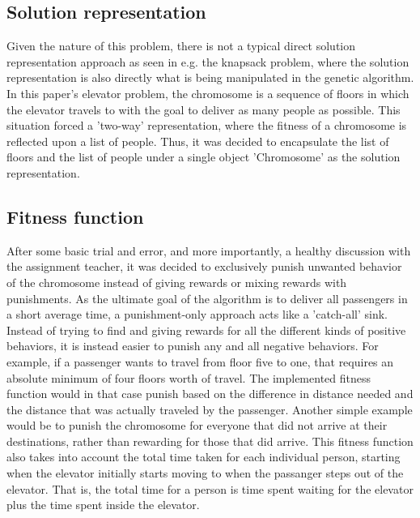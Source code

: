 \subsection{Solution representation}

Given the nature of this problem, there is not a typical direct solution representation approach as seen in e.g. the knapsack problem, where the solution representation is also directly what is being manipulated in the genetic algorithm. In this paper's elevator problem, the chromosome is a sequence of floors in which the elevator travels to with the goal to deliver as many people as possible. This situation forced a 'two-way' representation, where the fitness of a chromosome is reflected upon a list of people. Thus, it was decided to encapsulate the list of floors and the list of people under a single object 'Chromosome' as the solution representation.

\subsection{Fitness function}
\label{subsec:fitness_function}

After some basic trial and error, and more importantly, a healthy discussion with the assignment teacher, it was decided to exclusively punish unwanted behavior of the chromosome instead of giving rewards or mixing rewards with punishments. As the ultimate goal of the algorithm is to deliver all passengers in a short average time, a punishment-only approach acts like a 'catch-all' sink. Instead of trying to find and giving rewards for all the different kinds of positive behaviors, it is instead easier to punish any and all negative behaviors. For example, if a passenger wants to travel from floor five to one, that requires an absolute minimum of four floors worth of travel. The implemented fitness function would in that case punish based on the difference in distance needed and the distance that was actually traveled by the passenger. Another simple example would be to punish the chromosome for everyone that did not arrive at their destinations, rather than rewarding for those that did arrive.  This fitness function also takes into account the total time taken for each individual person, starting when the elevator initially starts moving to when the passanger steps out of the elevator. That is, the total time for a person is time spent waiting for the elevator plus the time spent inside the elevator.
